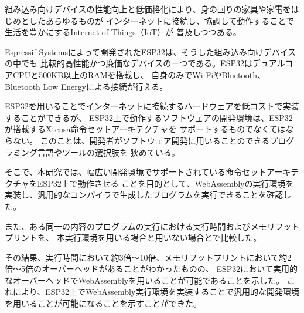 \begin{jabstract}

組み込み向けデバイスの性能向上と低価格化により、身の回りの家具や家電をはじめとしたあらゆるものが
インターネットに接続し、協調して動作することで生活を豊かにするInternet of Things（IoT）が
普及しつつある。

Espressif Systemsによって開発されたESP32は、そうした組み込み向けデバイスの中でも
比較的高性能かつ廉価なデバイスの一つである。ESP32はデュアルコアCPUと500KB以上のRAMを搭載し、
自身のみでWi-FiやBluetooth、Bluetooth Low Energyによる接続が行える。

ESP32を用いることでインターネットに接続するハードウェアを低コストで実装することができるが、
ESP32上で動作するソフトウェアの開発環境は、ESP32が搭載するXtensa命令セットアーキテクチャを
サポートするものでなくてはならない。
このことは、開発者がソフトウェア開発に用いることのできるプログラミング言語やツールの選択肢を
狭めている。

そこで、本研究では、幅広い開発環境でサポートされている命令セットアーキテクチャをESP32上で動作させる
ことを目的として、WebAssemblyの実行環境を実装し、汎用的なコンパイラで生成したプログラムを実行できることを確認した。

また、ある同一の内容のプログラムの実行における実行時間およびメモリフットプリントを、
本実行環境を用いる場合と用いない場合とで比較した。

その結果、実行時間において約3倍〜10倍、メモリフットプリントにおいて約2倍〜5倍のオーバーヘッドがあることがわかったものの、
ESP32において実用的なオーバーヘッドでWebAssemblyを用いることが可能であることを示した。
これにより、ESP32上でWebAssembly実行環境を実装することで汎用的な開発環境を用いることが可能になることを示すことができた。

\end{jabstract}
